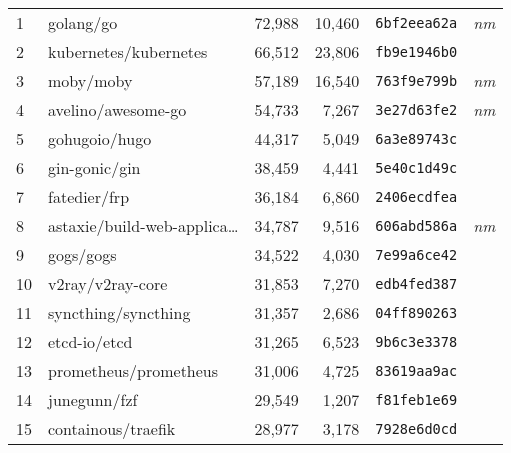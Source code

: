 {\fontsize{5.1}{6}\selectfont
    \begin{supertabular}{llrrll}

        1   &                          golang/go & 72,988 & 10,460 &  \texttt{6bf2eea62a} &  \textit{nm} \\
        2   &              kubernetes/kubernetes & 66,512 & 23,806 &  \texttt{fb9e1946b0} &              \\
        3   &                          moby/moby & 57,189 & 16,540 &  \texttt{763f9e799b} &  \textit{nm} \\
        4   &                 avelino/awesome-go & 54,733 &  7,267 &  \texttt{3e27d63fe2} &  \textit{nm} \\
        5   &                      gohugoio/hugo & 44,317 &  5,049 &  \texttt{6a3e89743c} &              \\
        6   &                      gin-gonic/gin & 38,459 &  4,441 &  \texttt{5e40c1d49c} &              \\
        7   &                       fatedier/frp & 36,184 &  6,860 &  \texttt{2406ecdfea} &              \\
        8   &    astaxie/build-web-applica\ldots & 34,787 &  9,516 &  \texttt{606abd586a} &  \textit{nm} \\
        9   &                          gogs/gogs & 34,522 &  4,030 &  \texttt{7e99a6ce42} &              \\
        10  &                   v2ray/v2ray-core & 31,853 &  7,270 &  \texttt{edb4fed387} &              \\
        11  &                syncthing/syncthing & 31,357 &  2,686 &  \texttt{04ff890263} &              \\
        12  &                       etcd-io/etcd & 31,265 &  6,523 &  \texttt{9b6c3e3378} &              \\
        13  &              prometheus/prometheus & 31,006 &  4,725 &  \texttt{83619aa9ac} &              \\
        14  &                       junegunn/fzf & 29,549 &  1,207 &  \texttt{f81feb1e69} &              \\
        15  &                 containous/traefik & 28,977 &  3,178 &  \texttt{7928e6d0cd} &              \\

\end{supertabular}}
